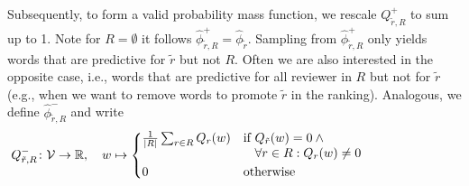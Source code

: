 \documentclass[letterpaper,twocolumn,10pt]{article}
\newcommand{\vocabulary}{\mathcal{V}}
\newcommand{\surroundingreviewers}{R}
\newcommand{\reviewer}{r}
\newcommand{\reviewerwordsmass}{Q}
\newcommand{\reviewerwords}{\hat{\topicworddist}}
\newcommand{\topicworddist}{\phi}
\newcommand{\word}{w}
\begin{document}
Subsequently, to form a valid probability {mass\EndAccSupp{}} function, we rescale $\reviewerwordsmass^+_{\tilde{\reviewer}, \surroundingreviewers}$ to sum up to 1. Note for $\surroundingreviewers = \emptyset$ it follows $\reviewerwords^+_{\tilde{\reviewer}, \surroundingreviewers} = \reviewerwords_{\tilde{\reviewer}}$. 
Sampling from $\reviewerwords^+_{\tilde{\reviewer}, \surroundingreviewers}$ only yields words that are predictive for $\tilde{\reviewer}$ but not $\surroundingreviewers$. 
Often we are also interested in the opposite case, i.e., words that are predictive for all reviewer in $\surroundingreviewers$ but not for $\tilde{\reviewer}$ (e.g., when we want to remove words to promote $\tilde{\reviewer}$ in the ranking). Analogous, we define  $\reviewerwords^-_{\tilde{\reviewer}, \surroundingreviewers}$ and write 
\[
    \reviewerwordsmass^-_{\tilde{\reviewer}, \surroundingreviewers} \colon \vocabulary \rightarrow \mathbb{R}, \quad \word \mapsto
    \begin{cases*}
        \frac{1}{|\surroundingreviewers|}\sum_{\reviewer \in \surroundingreviewers}{\reviewerwordsmass_{\reviewer}(w)} &
        if \parbox[t]{5.5cm}{$\reviewerwordsmass_{\tilde{\reviewer}}(w) = 0 \wedge\\   
         \forall r \in \surroundingreviewers: \reviewerwordsmass_{\reviewer}(w) \neq 0$} \\
        0 & otherwise \\
    \end{cases*}
\]
\end{document}
